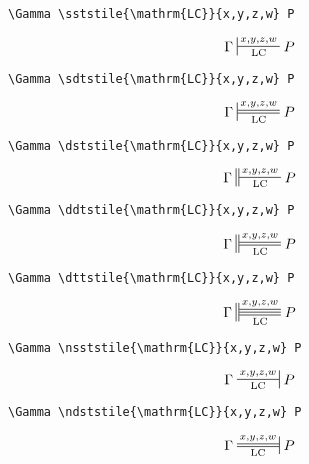 \documentclass{pracjourn}
\begin{document}
\begin{verbatim}
\Gamma \sststile{\mathrm{LC}}{x,y,z,w} P
\end{verbatim}
\begin{equation}\Gamma \sststile{\mathrm{LC}}{x,y,z,w} P\end{equation} \vspace{0.4em}

\begin{verbatim}
\Gamma \sdtstile{\mathrm{LC}}{x,y,z,w} P
\end{verbatim}
\begin{equation}\Gamma \sdtstile{\mathrm{LC}}{x,y,z,w} P\end{equation} \vspace{0.4em}

\begin{verbatim}
\Gamma \dststile{\mathrm{LC}}{x,y,z,w} P
\end{verbatim}
\begin{equation}\Gamma \dststile{\mathrm{LC}}{x,y,z,w} P\end{equation} \vspace{0.4em}

\begin{verbatim}
\Gamma \ddtstile{\mathrm{LC}}{x,y,z,w} P
\end{verbatim}
\begin{equation}\Gamma \ddtstile{\mathrm{LC}}{x,y,z,w} P\end{equation} \vspace{0.4em}
     
\pagebreak

\begin{verbatim}
\Gamma \dttstile{\mathrm{LC}}{x,y,z,w} P
\end{verbatim}
\begin{equation}\Gamma \dttstile{\mathrm{LC}}{x,y,z,w} P\end{equation} \vspace{0.4em}
         
\begin{verbatim}
\Gamma \nsststile{\mathrm{LC}}{x,y,z,w} P
\end{verbatim}
\begin{equation}\Gamma \nsststile{\mathrm{LC}}{x,y,z,w} P\end{equation} \vspace{0.4em}

\begin{verbatim}
\Gamma \ndststile{\mathrm{LC}}{x,y,z,w} P
\end{verbatim}
\begin{equation}\Gamma \ndststile{\mathrm{LC}}{x,y,z,w} P\end{equation} \vspace{0.4em}
\end{document}

